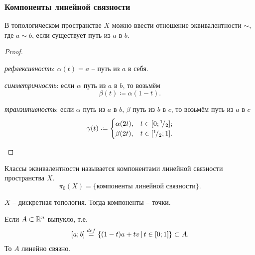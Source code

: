 \subsubsection{Компоненты линейной связности}

\begin{theorem}
    В топологическом пространстве $X$ можно ввести отношение эквивалентности $\sim$, где $a\sim b$, если существует путь из $a$ в $b$.
\end{theorem}
\begin{proof}
    \begin{conditions}
        \item \emph{рефлексивность}: $\alpha(t) = a$ -- путь из $a$ в себя.
        \item \emph{симметричность}: если $\alpha$ путь из $a$ в $b$, то возьмём \begin{equation}
            \beta(t) \coloneq \alpha(1-t).
        \end{equation}
        \item \emph{транзитивность}: если $\alpha$ путь из $a$ в $b$, $\beta$ путь из $b$ в $c$, то возьмём путь из $a$ в $c$ \begin{equation}
                \gamma(t) \coloneq \begin{cases}
                \alpha(2t), &t\in[0;\rfrac 1 2];\\
                \beta(2t), &t\in[\rfrac 1 2; 1].
            \end{cases}
        \end{equation}
    \end{conditions}
\end{proof}

\begin{definition}
    Классы эквивалентности называется компонентами линейной связности пространства $X$. $$\pi_0(X) = \{\text{компоненты линейной связности}\}.$$
\end{definition}

\begin{example}
    $X$ -- дискретная топология. Тогда компоненты -- точки.
\end{example}

\begin{proposition}
    Если $A \subset \mathbb R^n$ выпукло, т.е. $$[a; b]\overset{def}{=} \{(1-t)a+tv\,|\, t\in[0;1]\}\subset A.$$ То $A$ линейно связно.
\end{proposition}

